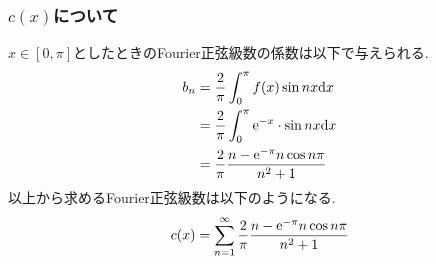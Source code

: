\subsubsection*{$c(x)$について}
$x\in[0,\pi]$としたときのFourier正弦級数の係数は以下で与えられる.
\begin{align*}
  b_n & =\frac{2}{\pi}\int^\pi_{0}f(x)\sin nx{\rm d}x              \\
      & =\frac{2}{\pi}\int^{\pi}_0{\rm e}^{-x}\cdot\sin nx{\rm d}x \\
      & =\frac{2}{\pi}\frac{n-{\rm e}^{-\pi}n\cos n\pi}{n^2+1}
\end{align*}
以上から求めるFourier正弦級数は以下のようになる.
\begin{align*}
  c(x)=\sum^\infty_{n=1}\frac{2}{\pi}\frac{n-{\rm e}^{-\pi}n\cos n\pi}{n^2+1}
\end{align*}
